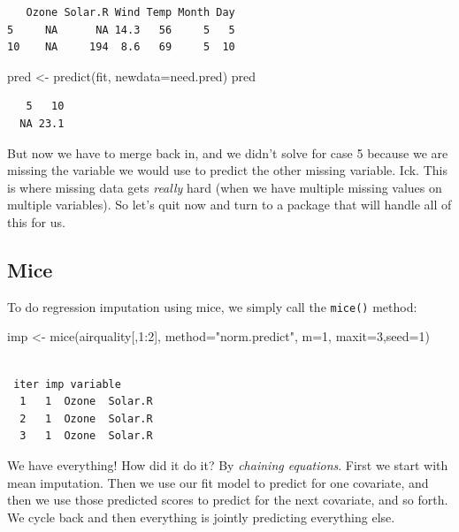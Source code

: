\documentclass[
  letterpaper,
  DIV=11,
  numbers=noendperiod]{scrreprt}
\newenvironment{Shaded}{\begin{snugshade}}{\end{snugshade}}
\newcommand{\AttributeTok}[1]{\textcolor[rgb]{0.49,0.56,0.16}{#1}}
\newcommand{\DecValTok}[1]{\textcolor[rgb]{0.25,0.63,0.44}{#1}}
\newcommand{\FunctionTok}[1]{\textcolor[rgb]{0.02,0.16,0.49}{#1}}
\newcommand{\NormalTok}[1]{\textcolor[rgb]{0.00,0.44,0.13}{#1}}
\newcommand{\OtherTok}[1]{\textcolor[rgb]{0.00,0.44,0.13}{#1}}
\newcommand{\SpecialCharTok}[1]{\textcolor[rgb]{0.25,0.44,0.63}{#1}}
\newcommand{\StringTok}[1]{\textcolor[rgb]{0.25,0.44,0.63}{#1}}
\begin{document}
\begin{verbatim}
   Ozone Solar.R Wind Temp Month Day
5     NA      NA 14.3   56     5   5
10    NA     194  8.6   69     5  10
\end{verbatim}

\begin{Shaded}
\begin{Highlighting}[]
\NormalTok{  pred }\OtherTok{\textless{}{-}} \FunctionTok{predict}\NormalTok{(fit, }\AttributeTok{newdata=}\NormalTok{need.pred)}
\NormalTok{  pred}
\end{Highlighting}
\end{Shaded}

\begin{verbatim}
   5   10 
  NA 23.1 
\end{verbatim}

But now we have to merge back in, and we didn't solve for case 5 because
we are missing the variable we would use to predict the other missing
variable. Ick. This is where missing data gets \emph{really} hard (when
we have multiple missing values on multiple variables). So let's quit
now and turn to a package that will handle all of this for us.

\hypertarget{mice}{%
\subsection{Mice}\label{mice}}

To do regression imputation using mice, we simply call the
\texttt{mice()} method:

\begin{Shaded}
\begin{Highlighting}[]
\NormalTok{  imp }\OtherTok{\textless{}{-}} \FunctionTok{mice}\NormalTok{(airquality[,}\DecValTok{1}\SpecialCharTok{:}\DecValTok{2}\NormalTok{], }\AttributeTok{method=}\StringTok{"norm.predict"}\NormalTok{, }\AttributeTok{m=}\DecValTok{1}\NormalTok{, }\AttributeTok{maxit=}\DecValTok{3}\NormalTok{,}\AttributeTok{seed=}\DecValTok{1}\NormalTok{)}
\end{Highlighting}
\end{Shaded}

\begin{verbatim}

 iter imp variable
  1   1  Ozone  Solar.R
  2   1  Ozone  Solar.R
  3   1  Ozone  Solar.R
\end{verbatim}

We have everything! How did it do it? By \emph{chaining equations}.
First we start with mean imputation. Then we use our fit model to
predict for one covariate, and then we use those predicted scores to
predict for the next covariate, and so forth. We cycle back and then
everything is jointly predicting everything else.
\end{document}
